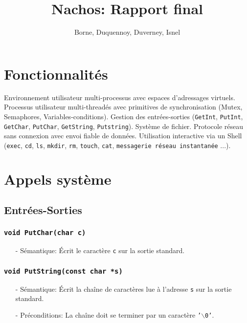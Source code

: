 \documentclass[11pt]{article}
\author{Borne, Duquennoy, Duverney, Isnel}
\date{}
\title{Nachos: Rapport final}
\theoremstyle{definition}
\theoremstyle{definition}
\begin{document}
\maketitle



\section{Fonctionnalités}
Environnement utilisateur multi-processus avec espaces d'adressages virtuels.
Processus utilisateur multi-threadés avec primitives de synchronisation (Mutex, Semaphores, Variables-conditions). Gestion des entrées-sorties (\texttt{GetInt}, \texttt{PutInt}, \texttt{GetChar}, \texttt{PutChar}, \texttt{GetString}, \texttt{Putstring}).
Système de fichier. Protocole réseau sans connexion avec envoi fiable de données.
Utilisation interactive via un Shell (\texttt{exec}, \texttt{cd}, \texttt{ls}, \texttt{mkdir}, \texttt{rm},
\texttt{touch}, \texttt{cat}, \texttt{messagerie réseau instantanée} ...).


\section{Appels système}
\subsection{Entrées-Sorties}

\subsubsection{\texttt{void PutChar(char c)}}
\begin{itemize}
\item[-] Sémantique: Écrit le caractère \texttt{c} sur la sortie standard.
\end{itemize}

\subsubsection{\texttt{void PutString(const char *s)}}
\begin{itemize}
\item[-] Sémantique: Écrit la chaîne de caractères lue à l'adresse \texttt{s} sur la sortie standard.
\item[-] Préconditions: La chaîne doit se terminer par un caractère \texttt{'$\backslash$0'}.
\end{itemize}
\end{document}

